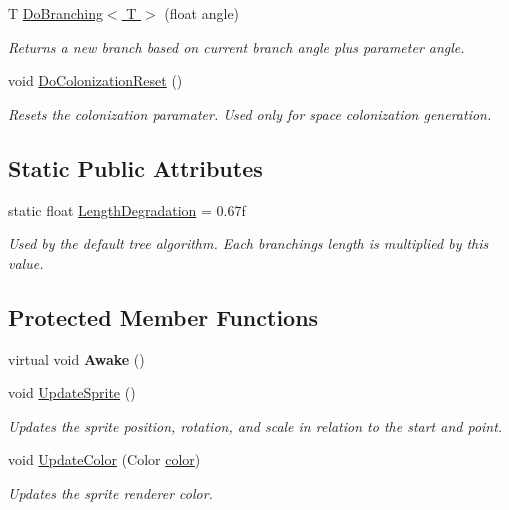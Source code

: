 \begin{DoxyCompactItemize}
T \hyperlink{class_fractal_tree_1_1_stationary_branch_a57ff42d0c4793c0c40aa1671905bf222}{Do\+Branching$<$ T $>$} (float angle)
\begin{DoxyCompactList}\small\item\em Returns a new branch based on current branch angle plus parameter angle. \end{DoxyCompactList}\item 
void \hyperlink{class_fractal_tree_1_1_stationary_branch_a57a5b1cbc9fd081c5b8cb41b61d24502}{Do\+Colonization\+Reset} ()
\begin{DoxyCompactList}\small\item\em Resets the colonization paramater. Used only for space colonization generation. \end{DoxyCompactList}\end{DoxyCompactItemize}
\subsection*{Static Public Attributes}
\begin{DoxyCompactItemize}
\item 
static float \hyperlink{class_fractal_tree_1_1_stationary_branch_a406e104be242fe61b1c1c1ea7d67f167}{Length\+Degradation} = 0.\+67f
\begin{DoxyCompactList}\small\item\em Used by the default tree algorithm. Each branchings length is multiplied by this value. \end{DoxyCompactList}\end{DoxyCompactItemize}
\subsection*{Protected Member Functions}
\begin{DoxyCompactItemize}
\item 
\hypertarget{class_fractal_tree_1_1_stationary_branch_a295c6b57b1040dac71a8195a6759ec92}{}\label{class_fractal_tree_1_1_stationary_branch_a295c6b57b1040dac71a8195a6759ec92} 
virtual void {\bfseries Awake} ()
\item 
void \hyperlink{class_fractal_tree_1_1_stationary_branch_a79b077e778c1d8aa92f3f4ad9a516058}{Update\+Sprite} ()
\begin{DoxyCompactList}\small\item\em Updates the sprite position, rotation, and scale in relation to the start and point. \end{DoxyCompactList}\item 
void \hyperlink{class_fractal_tree_1_1_stationary_branch_ae80389d3859645e0023dd11533b06e83}{Update\+Color} (Color \hyperlink{class_fractal_tree_1_1_stationary_branch_a265ca67d50299986adb192386fc7b932}{color})
\begin{DoxyCompactList}\small\item\em Updates the sprite renderer color. \end{DoxyCompactList}\end{DoxyCompactItemize}
